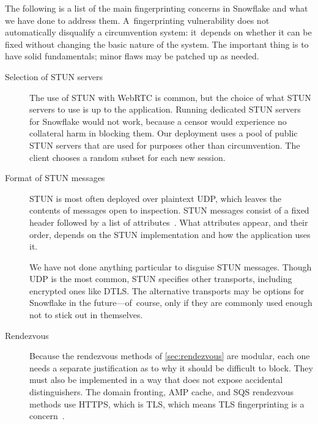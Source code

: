 \documentclass[letterpaper,twocolumn]{article}
\begin{document}
The following is a list of the main fingerprinting concerns in Snowflake and
what we have done to address them.
A~fingerprinting vulnerability
does not automatically disqualify a circumvention system:
it~depends on whether it can be fixed
without changing the basic nature of the system.
The important thing is to have solid fundamentals;
minor flaws may be patched up as needed.

\begin{description}
\item[Selection of STUN servers]
The use of STUN with WebRTC is common,
but the choice of what STUN servers to use is up to the application.
Running dedicated STUN servers for Snowflake would not work,
because a censor would experience no collateral harm in
blocking them.
Our deployment uses a pool of public STUN servers
that are used for purposes other than circumvention.
The client chooses a random subset
for each new session.

\item[Format of STUN messages]
STUN is most often deployed over plaintext UDP,
which leaves the contents of messages open to inspection.
STUN messages consist of a fixed header
followed by a list of
attributes~\cite[\S 5]{rfc8489}.
What attributes appear,
and their order,
depends on the STUN implementation
and how the application uses it.

We have not done anything particular
to disguise STUN messages.
Though UDP is the most common,
STUN specifies other transports,
including encrypted ones like DTLS.
The alternative transports may be options for Snowflake in the future---of~course,
only if they are commonly used enough not to
stick out in themselves.

\item[Rendezvous]
Because the rendezvous methods of
\autoref{sec:rendezvous}
are modular,
each one needs a separate justification
as to why it should be difficult to block.
They must also be implemented in a way
that does not expose accidental distinguishers.
The domain fronting, AMP cache, and SQS rendezvous methods
use HTTPS,
which is TLS,
which means TLS fingerprinting is a concern~\cite[\S 5.1]{Fifield2015a}.


\end{description}
\end{document}
